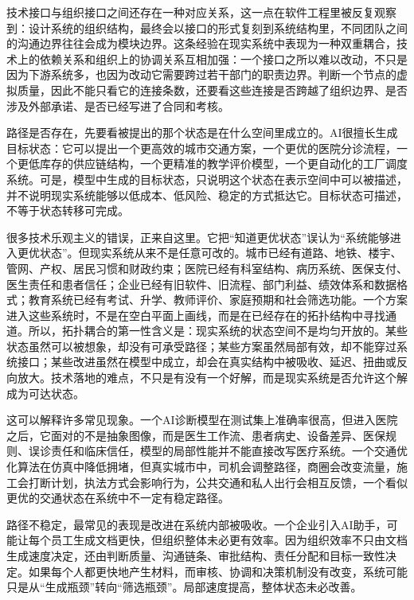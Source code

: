 技术接口与组织接口之间还存在一种对应关系，这一点在软件工程里被反复观察到：设计系统的组织结构，最终会以接口的形式复刻到系统结构里，不同团队之间的沟通边界往往会成为模块边界\cite{conway1968how}。这条经验在现实系统中表现为一种双重耦合，技术上的依赖关系和组织上的协调关系互相加强：一个接口之所以难以改动，不只是因为下游系统多，也因为改动它需要跨过若干部门的职责边界。判断一个节点的虚拟质量，因此不能只看它的连接条数，还要看这些连接是否跨越了组织边界、是否涉及外部承诺、是否已经写进了合同和考核。


路径是否存在，先要看被提出的那个状态是在什么空间里成立的。AI很擅长生成目标状态：它可以提出一个更高效的城市交通方案，一个更优的医院分诊流程，一个更低库存的供应链结构，一个更精准的教学评价模型，一个更自动化的工厂调度系统。可是，模型中生成的目标状态，只说明这个状态在表示空间中可以被描述，并不说明现实系统能够以低成本、低风险、稳定的方式抵达它。目标状态可描述，不等于状态转移可完成。

很多技术乐观主义的错误，正来自这里。它把“知道更优状态”误认为“系统能够进入更优状态”。但现实系统从来不是任意可改的。城市已经有道路、地铁、楼宇、管网、产权、居民习惯和财政约束；医院已经有科室结构、病历系统、医保支付、医生责任和患者信任；企业已经有旧软件、旧流程、部门利益、绩效体系和数据格式；教育系统已经有考试、升学、教师评价、家庭预期和社会筛选功能。一个方案进入这些系统时，不是在空白平面上画线，而是在已经存在的拓扑结构中寻找通道。所以，拓扑耦合的第一性含义是：现实系统的状态空间不是均匀开放的。某些状态虽然可以被想象，却没有可承受路径；某些方案虽然局部有效，却不能穿过系统接口；某些改进虽然在模型中成立，却会在真实结构中被吸收、延迟、扭曲或反向放大。技术落地的难点，不只是有没有一个好解，而是现实系统是否允许这个解成为可达状态。

这可以解释许多常见现象。一个AI诊断模型在测试集上准确率很高，但进入医院之后，它面对的不是抽象图像，而是医生工作流、患者病史、设备差异、医保规则、误诊责任和临床信任，模型的局部性能并不能直接改写医疗系统。一个交通优化算法在仿真中降低拥堵，但真实城市中，司机会调整路径，商圈会改变流量，施工会打断计划，执法方式会影响行为，公共交通和私人出行会相互反馈，一个看似更优的交通状态在系统中不一定有稳定路径。


路径不稳定，最常见的表现是改进在系统内部被吸收。一个企业引入AI助手，可能让每个员工生成文档更快，但组织整体未必更有效率。因为组织效率不只由文档生成速度决定，还由判断质量、沟通链条、审批结构、责任分配和目标一致性决定。如果每个人都更快地产生材料，而审核、协调和决策机制没有改变，系统可能只是从“生成瓶颈”转向“筛选瓶颈”。局部速度提高，整体状态未必改善。

